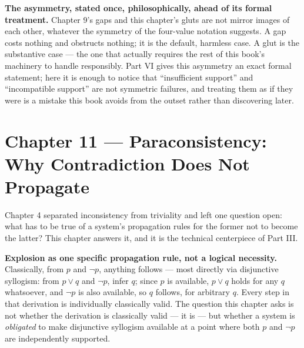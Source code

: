 \textbf{The asymmetry, stated once, philosophically, ahead of its formal
treatment.} Chapter 9's gaps and this chapter's gluts are not mirror
images of each other, whatever the symmetry of the four-value notation
suggests. A gap costs nothing and obstructs nothing; it is the default,
harmless case. A glut is the substantive case --- the one that actually
requires the rest of this book's machinery to handle responsibly. Part
VI gives this asymmetry an exact formal statement; here it is enough to
notice that ``insufficient support'' and ``incompatible support'' are not
symmetric failures, and treating them as if they were is a mistake this
book avoids from the outset rather than discovering later.

\hypertarget{chapter-11-paraconsistency-why-contradiction-does-not-propagate}{%
\chapter*{Chapter 11 --- Paraconsistency: Why Contradiction Does Not Propagate}
\label{chapter-11-paraconsistency-why-contradiction-does-not-propagate}}

Chapter 4 separated inconsistency from triviality and left one question
open: what has to be true of a system's propagation rules for the
former not to become the latter? This chapter answers it, and it is the
technical centerpiece of Part III.

\textbf{Explosion as one specific propagation rule, not a logical necessity.}
Classically, from \(p\) and \(\neg p\), anything follows --- most directly via
disjunctive syllogism: from \(p \vee q\) and \(\neg p\), infer \(q\); since \(p\)
is available, \(p \vee q\) holds for any \(q\) whatsoever, and \(\neg p\) is
also available, so \(q\) follows, for arbitrary \(q\). Every step in that
derivation is individually classically valid. The question this chapter
asks is not whether the derivation is classically valid --- it is --- but
whether a system is \emph{obligated} to make disjunctive syllogism available
at a point where both \(p\) and \(\neg p\) are independently supported.

